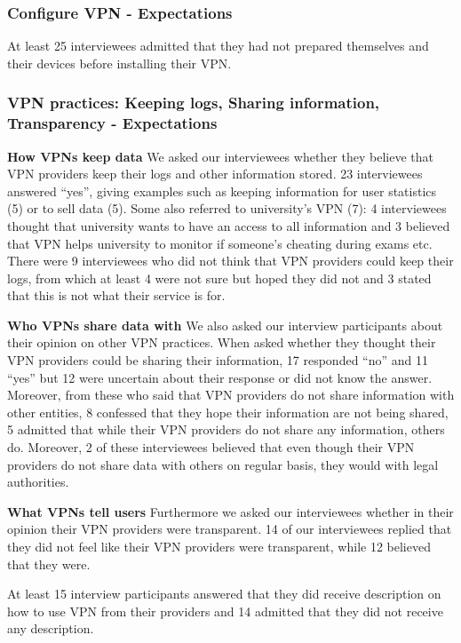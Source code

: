 \subsubsection{Configure VPN - Expectations} At least 25 interviewees admitted
that they had not prepared themselves and their devices before installing
their VPN.

\subsubsection{VPN practices: Keeping logs, Sharing information, Transparency
- Expectations} \textbf{How VPNs keep data} We asked our interviewees whether
they believe that VPN providers keep their logs and other information stored.
23 interviewees answered “yes”, giving examples such as keeping information
for user statistics (5) or to sell data (5). Some also referred to
university’s VPN (7): 4 interviewees thought that university wants to have an
access to all information and 3 believed that VPN helps university to monitor
if someone’s cheating during exams etc. There were 9 interviewees who did not
think that VPN providers could keep their logs, from which at least 4 were not
sure but hoped they did not and 3 stated that this is not what their service
is for.

\textbf{Who VPNs share data with} We also asked our interview participants
about their opinion on other VPN practices. When asked whether they thought
their VPN providers could be sharing their information, 17 responded “no” and
11 “yes” but 12 were uncertain about their response or did not know the
answer.  Moreover, from these who said that VPN providers do not share
information with other entities, 8 confessed that they hope their information
are not being shared, 5 admitted that while their VPN providers do not share
any information, others do. Moreover, 2 of these interviewees believed that
even though their VPN providers do not share data with others on regular
basis, they would with legal authorities. 

\textbf{What VPNs tell users} Furthermore we asked our interviewees whether in
their opinion their VPN providers were transparent. 14 of our interviewees
replied that they did not feel like their VPN providers were transparent,
while 12 believed that they were. 

At least 15 interview participants answered that they did receive description
on how to use VPN from their providers and 14 admitted that they did not
receive any description.  

